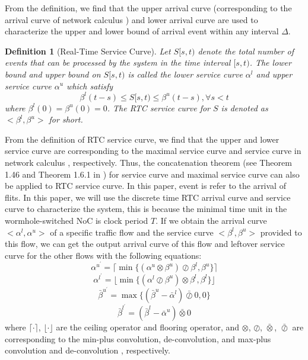 \documentclass[10pt,journal]{IEEEtran}
\newtheorem{definition}{Definition}
\begin{document}
From the definition, we find that the upper arrival curve (corresponding to the arrival curve of network calculus \cite{Boudec2001Network}) and lower arrival curve are used to characterize the upper and lower bound of arrival event within any interval $\Delta$.

\begin{definition}[Real-Time Service Curve]
Let $S[s,t)$ denote the total number of events that can be processed by the system in the time interval $[s,t)$. The lower bound and upper bound on $S[s,t)$ is called the lower service curve $\alpha^l$ and upper service curve $\alpha^u$ which satisfy
$$\beta^l(t-s)\leq S[s,t)\leq \beta^u(t-s),\forall s<t$$
where $\beta^l(0)=\beta^u(0)=0$. The RTC service curve for $S$ is denoted as $<\beta^l,\beta^u>$ for short.
\end{definition}

From the definition of RTC service curve, we find that the upper and lower service curve are corresponding to the maximal service curve and service curve in network calculus \cite{Boudec2001Network}, respectively. Thus, the concatenation theorem (see Theorem 1.46 and Theorem 1.6.1 in \cite{Boudec2001Network}) for service curve and maximal service curve can also be applied to RTC service curve. In this paper, event is refer to the arrival of flits. In this paper, we will use the discrete time RTC arrival curve and service curve to characterize the system, this is because the minimal time unit in the wormhole-switched NoC is clock period $T$. If we obtain the arrival curve $<\alpha^l,\alpha^u>$ of a specific traffic flow and the service curve $<\beta^l,\beta^u>$ provided to this flow, we can get the output arrival curve of this flow and leftover service curve for the other flows with the following equations:
\begin{equation}\label{alphau}
\alpha^{u^\prime}=\lceil\min\{(\alpha^u\otimes\beta^u)\oslash\beta^l,\beta^u\}\rceil
\end{equation}
\begin{equation}\label{alphal}
\alpha^{l^\prime}=\lfloor\min\{(\alpha^l\oslash\beta^u)\otimes\beta^l,\beta^l\}\rfloor
\end{equation}
\begin{equation}\label{betau}
\bar{\beta}^{u^\prime}=\max\{(\bar{\beta}^u-\bar{\alpha}^l)\bar{\oslash}0,0\}
\end{equation}
\begin{equation}\label{betal}
\bar{\beta}^{l^\prime}=(\bar{\beta}^l-\bar{\alpha}^u)\bar{\otimes}0
\end{equation}
where $\lceil\cdot\rceil$, $\lfloor\cdot\rfloor$ are the ceiling operator and flooring operator, and $\otimes$, $\oslash$, $\bar{\otimes}$, $\bar{\oslash}$ are corresponding to the min-plus convolution, de-convolution, and max-plus convolution and de-convolution \cite{Boudec2001Network}, respectively.
\end{document}
